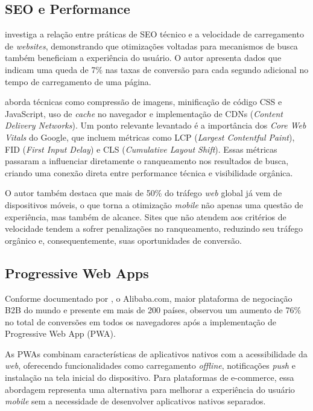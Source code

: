 \subsection{SEO e Performance}

\cite{bansal_seo_2024} investiga a relação entre práticas de SEO técnico e a velocidade de carregamento de \textit{websites}, demonstrando que otimizações voltadas para mecanismos de busca também beneficiam a experiência do usuário. O autor apresenta dados que indicam uma queda de 7\% nas taxas de conversão para cada segundo adicional no tempo de carregamento de uma página.

\cite{bansal_seo_2024} aborda técnicas como compressão de imagens, minificação de código CSS e JavaScript, uso de \textit{cache} no navegador e implementação de CDNs (\textit{Content Delivery Networks}). Um ponto relevante levantado é a importância dos \textit{Core Web Vitals} do Google, que incluem métricas como LCP (\textit{Largest Contentful Paint}), FID (\textit{First Input Delay}) e CLS (\textit{Cumulative Layout Shift}). Essas métricas passaram a influenciar diretamente o ranqueamento nos resultados de busca, criando uma conexão direta entre performance técnica e visibilidade orgânica.

O autor também destaca que mais de 50\% do tráfego \textit{web} global já vem de dispositivos móveis, o que torna a otimização \textit{mobile} não apenas uma questão de experiência, mas também de alcance. Sites que não atendem aos critérios de velocidade tendem a sofrer penalizações no ranqueamento, reduzindo seu tráfego orgânico e, consequentemente, suas oportunidades de conversão.

\subsection{Progressive Web Apps}

Conforme documentado por \cite{google_alibaba_2016}, o Alibaba.com, maior plataforma de negociação B2B do mundo e presente em mais de 200 países, observou um aumento de 76\% no total de conversões em todos os navegadores após a implementação de Progressive Web App (PWA).

As PWAs combinam características de aplicativos nativos com a acessibilidade da \textit{web}, oferecendo funcionalidades como carregamento \textit{offline}, notificações \textit{push} e instalação na tela inicial do dispositivo. Para plataformas de e-commerce, essa abordagem representa uma alternativa para melhorar a experiência do usuário \textit{mobile} sem a necessidade de desenvolver aplicativos nativos separados.

